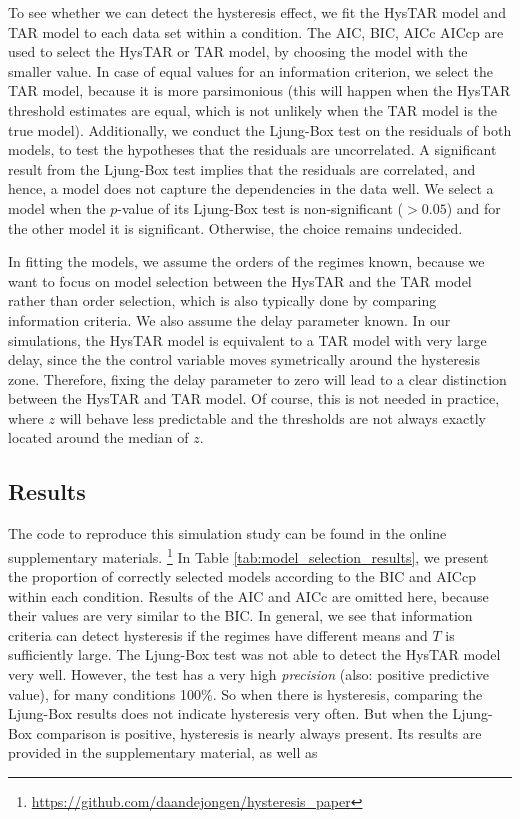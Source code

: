 \documentclass{article}
\begin{document}
To see whether we can detect the hysteresis effect, we fit the HysTAR model and TAR model to each data set within a condition.
The AIC, BIC, AICc AICcp are used to select the HysTAR or TAR model, by choosing the model with the smaller value.
In case of equal values for an information criterion, we select the TAR model, because it is more parsimonious (this will happen when the HysTAR threshold estimates are equal, which is not unlikely when the TAR model is the true model). 
Additionally, we conduct the Ljung-Box test on the residuals of both models, to test the hypotheses that the residuals are uncorrelated.
A significant result from the Ljung-Box test implies that the residuals are correlated, and hence, a model does not capture the dependencies in the data well.
We select a model when the $p$-value of its Ljung-Box test is non-significant ($>0.05$) and for the other model it is significant. Otherwise, the choice remains undecided.

In fitting the models, we assume the orders of the regimes known, because we want to focus on model selection between the HysTAR and the TAR model rather than order selection, which is also typically done by comparing information criteria. 
We also assume the delay parameter known. 
In our simulations, the HysTAR model is equivalent to a TAR model with very large delay, since the the control variable moves symetrically around the hysteresis zone.
Therefore, fixing the delay parameter to zero will lead to a clear distinction between the HysTAR and TAR model.
Of course, this is not needed in practice, where $z$ will behave less predictable and the thresholds are not always exactly located around the median of $z$.

\subsection{Results}
\label{sec:model_selection_results}
The code to reproduce this simulation study can be found in the online supplementary materials.
\footnote{\url{https://github.com/daandejongen/hysteresis_paper}}
In Table \ref{tab:model_selection_results}, we present the proportion of correctly selected models according to the BIC and AICcp within each condition. Results of the AIC and AICc are omitted here, because their values are very similar to the BIC. In general, we see that information criteria can detect hysteresis if the regimes have different means and $T$ is sufficiently large. 
The Ljung-Box test was not able to detect the HysTAR model very well. However, the test has a very high \textit{precision} (also: positive predictive value), for many conditions 100\%. So when there is hysteresis, comparing the Ljung-Box results does not indicate hysteresis very often. But when the Ljung-Box comparison is positive, hysteresis is nearly always present.
Its results are provided in the supplementary material, as well as 
\end{document}
